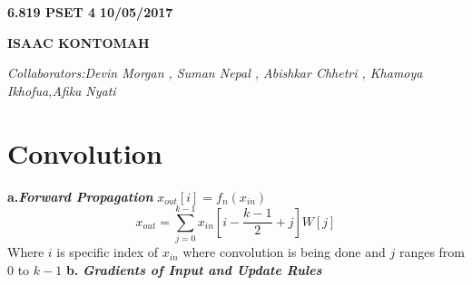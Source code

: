 \documentclass[a4paper,12pt]{article}
\begin{document}
\begin{flushleft}\newline \textbf{6.819 PSET 4}
\newline \textbf{10/05/2017}
\end{flushleft}
\newline \begin{center}\textbf{ISAAC KONTOMAH}
\end{center}
\begin{flushleft}
\newline \emph{Collaborators:Devin Morgan , Suman Nepal , Abishkar Chhetri ,  Khamoya Ikhofua,Afika Nyati}
\end{flushleft}

\newline \section{Convolution}
\newline \textbf{a.}\emph{\textbf{Forward Propagation}}
\newline $x_{out}[i]=f_{n}(x_{in})$
\newline $$x_{out}=\sum_{j=0}^{k-1}x_{in}[i-\frac{k-1}{2}+j]W[j] $$
\newline Where $i$ is specific index of $x_{in}$ where convolution is being done and $j$ ranges from $0$ to $k-1$
\newline \textbf{b.} \emph{\textbf{Gradients of Input and Update Rules}}
\end{document}
